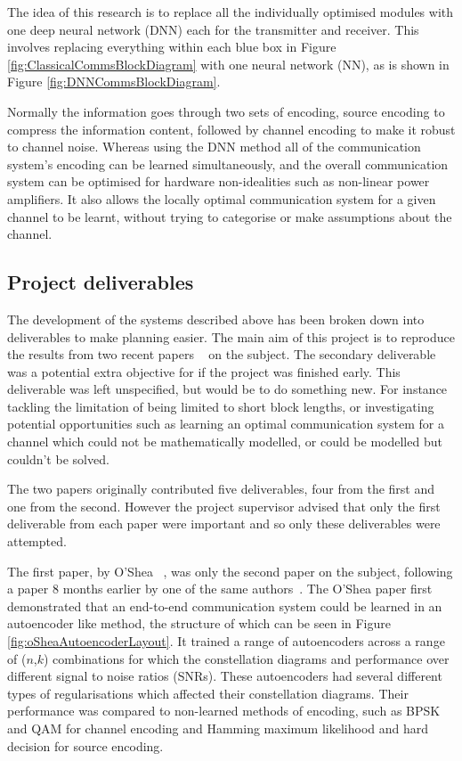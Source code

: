 \documentclass[12pt,onecolumn,letterpaper]{article}
\begin{document}
The idea of this research is to replace all the individually optimised modules with one deep neural network (DNN) each for the transmitter and receiver. This involves replacing everything within each blue box in Figure \ref{fig:ClassicalCommsBlockDiagram} with one neural network (NN), as is shown in Figure \ref{fig:DNNCommsBlockDiagram}. 

Normally the information goes through two sets of encoding, source encoding to compress the information content, followed by channel encoding to make it robust to channel noise. Whereas using the DNN method all of the communication system's encoding can be learned simultaneously, and the overall communication system can be optimised for hardware non-idealities such as non-linear power amplifiers. It also allows the locally optimal communication system for a given channel to be learnt, without trying to categorise or make assumptions about the channel.

\subsection{Project deliverables}

The development of the systems described above has been broken down into deliverables to make planning easier. The main aim of this project is to reproduce the results from two recent papers ~\cite{oShea,Aoudia} on the subject. The secondary deliverable was a potential extra objective for if the project was finished early. This deliverable was left unspecified, but would be to do something new. For instance tackling the limitation of being limited to short block lengths, or investigating potential opportunities such as learning an optimal communication system for a channel which could not be mathematically modelled, or could be modelled but couldn't be solved.

The two papers originally contributed five deliverables, four from the first and one from the second. However the project supervisor advised that only the first deliverable from each paper were important and so only these deliverables were attempted. 

The first paper, by O'Shea \etal~\cite{oShea}, was only the second paper on the subject, following a paper 8 months earlier by one of the same authors~\cite{oShea0}. The O'Shea paper first demonstrated that an end-to-end communication system could be learned in an autoencoder like method, the structure of which can be seen in Figure \ref{fig:oSheaAutoencoderLayout}. It trained a range of autoencoders across a range of ($n$,$k$) combinations for which the constellation diagrams and performance over different signal to noise ratios (SNRs). These autoencoders had several different types of regularisations which affected their constellation diagrams. Their performance was compared to non-learned methods of encoding, such as BPSK and QAM for channel encoding and Hamming maximum likelihood and hard decision for source encoding. 
\end{document}
